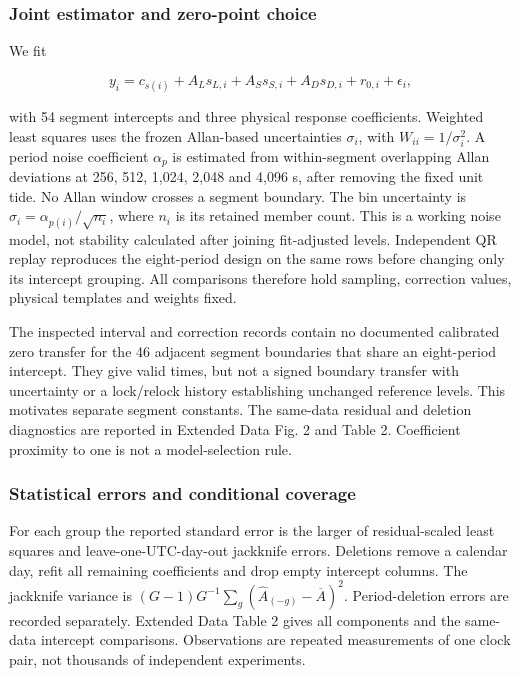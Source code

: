 \documentclass[
  10pt,
  a4paper,
]{article}
\begin{document}
\hypertarget{joint-estimator-and-zero-point-choice}{%
\subsubsection{Joint estimator and zero-point
choice}\label{joint-estimator-and-zero-point-choice}}

We fit

\[y_i=c_{s(i)}+A_Ls_{L,i}+A_Ss_{S,i}+A_Ds_{D,i}+r_{0,i}+\epsilon_i,\]

with 54 segment intercepts and three physical response coefficients.
Weighted least squares uses the frozen Allan-based uncertainties
\(\sigma_i\), with \(W_{ii}=1/\sigma_i^2\). A period noise coefficient
\(\alpha_p\) is estimated from within-segment overlapping Allan
deviations at 256, 512, 1,024, 2,048 and 4,096 s, after removing the
fixed unit tide. No Allan window crosses a segment boundary. The bin
uncertainty is \(\sigma_i=\alpha_{p(i)}/\sqrt{n_i}\), where \(n_i\) is
its retained member count. This is a working noise model, not stability
calculated after joining fit-adjusted levels. Independent QR replay
reproduces the eight-period design on the same rows before changing only
its intercept grouping. All comparisons therefore hold sampling,
correction values, physical templates and weights fixed.

The inspected interval and correction records contain no documented
calibrated zero transfer for the 46 adjacent segment boundaries that
share an eight-period intercept. They give valid times, but not a signed
boundary transfer with uncertainty or a lock/relock history establishing
unchanged reference levels. This motivates separate segment constants.
The same-data residual and deletion diagnostics are reported in Extended
Data Fig. 2 and Table 2. Coefficient proximity to one is not a
model-selection rule.

\hypertarget{statistical-errors-and-conditional-coverage}{%
\subsubsection{Statistical errors and conditional
coverage}\label{statistical-errors-and-conditional-coverage}}

For each group the reported standard error is the larger of
residual-scaled least squares and leave-one-UTC-day-out jackknife
errors. Deletions remove a calendar day, refit all remaining
coefficients and drop empty intercept columns. The jackknife variance is
\((G-1)G^{-1}\sum_g(\hat A_{(-g)}-\overline A)^2\). Period-deletion
errors are recorded separately. Extended Data Table 2 gives all
components and the same-data intercept comparisons. Observations are
repeated measurements of one clock pair, not thousands of independent
experiments.
\end{document}
